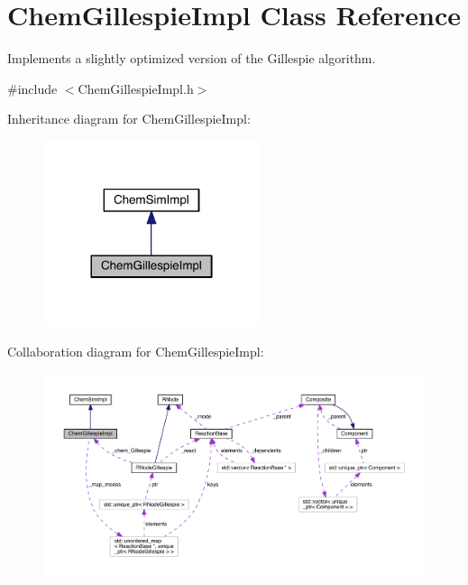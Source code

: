 \hypertarget{classChemGillespieImpl}{\section{Chem\+Gillespie\+Impl Class Reference}
\label{classChemGillespieImpl}
}


Implements a slightly optimized version of the Gillespie algorithm.  




{\ttfamily \#include $<$Chem\+Gillespie\+Impl.\+h$>$}



Inheritance diagram for Chem\+Gillespie\+Impl\+:\nopagebreak
\begin{figure}[H]
\begin{center}
\leavevmode
\includegraphics[width=180pt]{classChemGillespieImpl__inherit__graph}
\end{center}
\end{figure}


Collaboration diagram for Chem\+Gillespie\+Impl\+:
\nopagebreak
\begin{figure}[H]
\begin{center}
\leavevmode
\includegraphics[width=350pt]{classChemGillespieImpl__coll__graph}
\end{center}
\end{figure}
